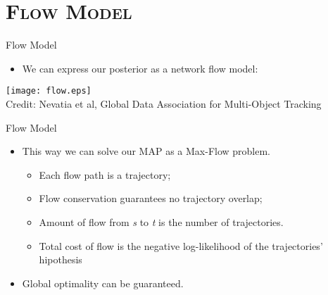 \section{\scshape Flow Model}
\begin{frame}{Flow Model}
	\begin{itemize}

		\item We can express our posterior as a network flow model:\end{itemize}
	\begin{center}
    {\texttt{[image: flow.eps]}\\[-1ex]
		{\tiny Credit: Nevatia et al, Global Data Association for Multi-Object Tracking}}
	\end{center}
\end{frame}


\begin{frame}{Flow Model}
	\begin{itemize}
		\item This way we can solve our MAP as a Max-Flow problem.
		\begin{itemize}
			\item Each flow path is a trajectory;
			\item Flow conservation guarantees no trajectory overlap;
			\item Amount of flow from \textit{s} to \textit{t} is the number of trajectories.
			\item Total cost of flow is the negative log-likelihood of the trajectories' hipothesis
		\end{itemize}
		\item Global optimality can be guaranteed.
	\end{itemize}
\end{frame}

